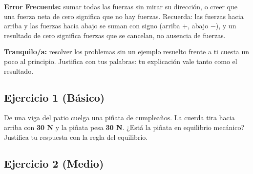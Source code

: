 \documentclass[
  spanish,
  letterpaper,
  12pt,
  oneside,
  open=any,
  DIV=15]{scrbook}
\begin{document}
\begin{tcolorbox}[enhanced jigsaw, arc=.35mm, bottomrule=.15mm, bottomtitle=1mm, breakable, colback=white, colbacktitle=quarto-callout-caution-color!10!white, colframe=quarto-callout-caution-color-frame, coltitle=black, left=2mm, leftrule=.75mm, opacityback=0, opacitybacktitle=0.6, rightrule=.15mm, title=\textcolor{quarto-callout-caution-color}{\faFire}\hspace{0.5em}{Prevención de Errores (Cuidado)}, titlerule=0mm, toprule=.15mm, toptitle=1mm]

\textbf{Error Frecuente:} sumar todas las fuerzas sin mirar su
dirección, o creer que una fuerza neta de cero significa que no hay
fuerzas. Recuerda: las fuerzas hacia arriba y las fuerzas hacia abajo se
suman con signo (arriba +, abajo −), y un resultado de cero significa
fuerzas que se cancelan, no ausencia de fuerzas.

\end{tcolorbox}

\begin{tcolorbox}[enhanced jigsaw, arc=.35mm, bottomrule=.15mm, bottomtitle=1mm, breakable, colback=white, colbacktitle=quarto-callout-note-color!10!white, colframe=quarto-callout-note-color-frame, coltitle=black, left=2mm, leftrule=.75mm, opacityback=0, opacitybacktitle=0.6, rightrule=.15mm, title=\textcolor{quarto-callout-note-color}{\faInfo}\hspace{0.5em}{Apoyo Socioemocional}, titlerule=0mm, toprule=.15mm, toptitle=1mm]

\textbf{Tranquilo/a:} resolver los problemas sin un ejemplo resuelto
frente a ti cuesta un poco al principio. Justifica con tus palabras: tu
explicación vale tanto como el resultado.

\end{tcolorbox}

\subsection{Ejercicio 1 (Básico)}\label{ejercicio-1-buxe1sico-3}

De una viga del patio cuelga una piñata de cumpleaños. La cuerda tira
hacia arriba con \textcolor[HTML]{7C3AED}{\textbf{30 N}} y la piñata
pesa \textcolor[HTML]{2563EB}{\textbf{30 N}}. ¿Está la piñata en
equilibrio mecánico? Justifica tu respuesta con la regla del equilibrio.

\subsection{Ejercicio 2 (Medio)}\label{ejercicio-2-medio-3}
\end{document}
